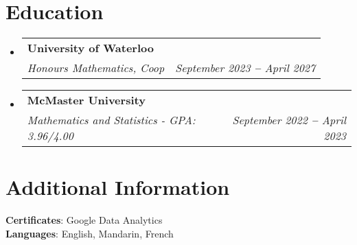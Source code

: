 \documentclass[letterpaper,11pt]{article}
\makeatletter
\newcommand{\resumeSubheading}[4]{
  \vspace{-2pt}\item
    \begin{tabular*}{0.97\textwidth}[t]{l@{\extracolsep{\fill}}r}
      \textbf{#1} & #2 \\
      \textit{\small#3} & \textit{\small #4} \\
    \end{tabular*}\vspace{-7pt}
}
\newcommand{\resumeSubHeadingListStart}{\begin{itemize}[leftmargin=0.15in, label={}]}
\newcommand{\resumeSubHeadingListEnd}{\end{itemize}}
\makeatother
\begin{document}
\section{Education}
  \resumeSubHeadingListStart
    \resumeSubheading
      {University of Waterloo}{}
      {Honours Mathematics, Coop}{September 2023 \textbf{--} April 2027}
    \resumeSubheading
      {McMaster University}{}
      {Mathematics and Statistics - GPA: 3.96/4.00}{September 2022 \textbf{--} April 2023}

  \resumeSubHeadingListEnd

\section{Additional Information}
 \begin{itemize}[leftmargin=0.15in, label={}]
    \small{\item{
     \textbf{Certificates}{: Google Data Analytics} \\
     \textbf{Languages}{: English, Mandarin, French} \\
    }}
 \end{itemize}
 
\end{document}

